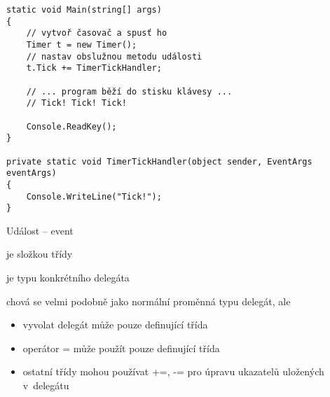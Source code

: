 \begin{frame}[fragile]
\begin{yesblock}
\begin{lstlisting}
static void Main(string[] args)
{
	// vytvoř časovač a spusť ho
    Timer t = new Timer();
    // nastav obslužnou metodu události
    t.Tick += TimerTickHandler;

    // ... program běží do stisku klávesy ...
    // Tick! Tick! Tick!

    Console.ReadKey();
}

private static void TimerTickHandler(object sender, EventArgs eventArgs)
{
    Console.WriteLine("Tick!");
}
\end{lstlisting}
\end{yesblock}
\end{frame}



\begin{frame}[fragile]
\begin{bitemize}{Událost -- event}
\item je složkou třídy
\item je  typu konkrétního delegáta
\item chová se velmi podobně jako normální proměnná typu delegát, ale
\begin{itemize}
\item vyvolat delegát může pouze definující třída
\item operátor = může použít pouze definující třída
\item ostatní třídy mohou používat +=, -= pro úpravu ukazatelů uložených v~delegátu
\end{itemize}
\end{bitemize}

\end{frame}






